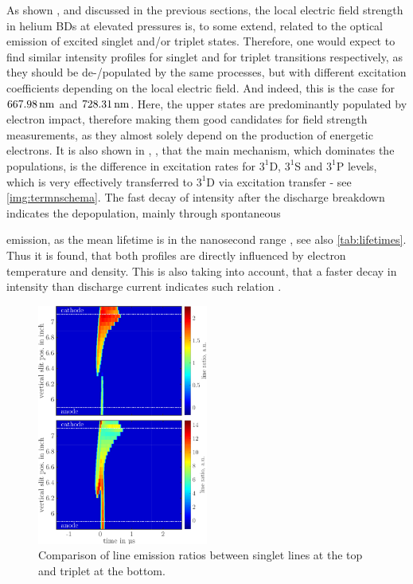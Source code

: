 \documentclass[a4paper,10pt,twoside]{article}
\begin{document}
\begin{multicols*}{2}
		As shown \cite{linratio1_14}, \cite{lineratio2_14} and discussed in the previous sections, the local electric field strength in helium BDs at elevated pressures is, to some extend, related to the optical emission of excited singlet and/or triplet states. Therefore, one would expect to find similar intensity profiles for singlet and for triplet transitions respectively, as they should be de-/populated by the same processes, but with different excitation coefficients depending on the local electric field. And indeed, this is the case for $\unit[667.98]{nm}$ and $\unit[728.31]{nm}$. Here, the upper states are predominantly populated by electron impact, therefore making them good candidates for field strength measurements, as they  almost solely depend on the production of energetic electrons. It is also shown in \cite{linratio1_14}, \cite{belmonte}, \cite{debreuil} that the main mechanism, which dominates the populations, is the difference in excitation rates for $3^1$D, $3^1$S and $3^1$P levels, which is very effectively transferred to $3^1$D via excitation transfer - see \autoref{img:termnschema}. The fast decay of intensity after the discharge breakdown indicates the depopulation, mainly through spontaneous
		
	\end{multicols*}
	
	\twocolumn
	
		 emission, as the mean lifetime is in the nanosecond range \cite{linratio1_14}, see also \autoref{tab:lifetimes}. Thus it is found, that both profiles are directly influenced by electron temperature and density. This is also taking into account, that a faster decay in intensity than discharge current indicates such relation \cite{electron_temp}.
		 
 			\begin{figure}[t!]
 				\centering
 				\includegraphics[width=0.5\textwidth]{figures/lineratio/combinations/lineratio667over706.pdf}
 				\caption{Comparison of line emission ratios between singlet lines at the top and triplet at the bottom.}
 				\label{img:comparisonlineratio}
 			\end{figure}
		 
\end{document}
